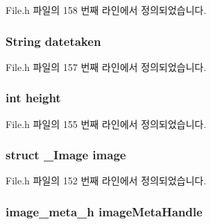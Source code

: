 File.\-h 파일의 158 번째 라인에서 정의되었습니다.

\hypertarget{struct___image_extends_a077fc46f97fd76e21ef941afe99e6eaa}{
\subsubsection[{datetaken}]{\setlength{\rightskip}{0pt plus 5cm}String datetaken}}\label{struct___image_extends_a077fc46f97fd76e21ef941afe99e6eaa}


File.\-h 파일의 157 번째 라인에서 정의되었습니다.

\hypertarget{struct___image_extends_ad12fc34ce789bce6c8a05d8a17138534}{
\subsubsection[{height}]{\setlength{\rightskip}{0pt plus 5cm}int height}}\label{struct___image_extends_ad12fc34ce789bce6c8a05d8a17138534}


File.\-h 파일의 155 번째 라인에서 정의되었습니다.

\hypertarget{struct___image_extends_a24c96542e7d59186d5d414503928920a}{
\subsubsection[{image}]{\setlength{\rightskip}{0pt plus 5cm}struct {\bf \-\_\-\-Image} image}}\label{struct___image_extends_a24c96542e7d59186d5d414503928920a}


File.\-h 파일의 152 번째 라인에서 정의되었습니다.

\hypertarget{struct___image_extends_a9cb994692e8daaf094623152f5f88d53}{
\subsubsection[{image\-Meta\-Handle}]{\setlength{\rightskip}{0pt plus 5cm}image\-\_\-meta\-\_\-h image\-Meta\-Handle}}\label{struct___image_extends_a9cb994692e8daaf094623152f5f88d53}


